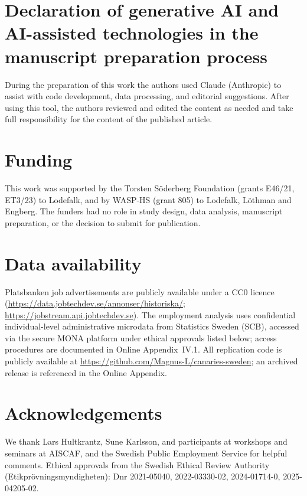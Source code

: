 \documentclass[preprint,12pt,authoryear]{elsarticle}
\begin{document}
\section*{Declaration of generative AI and AI-assisted technologies in the manuscript preparation process}
During the preparation of this work the authors used Claude (Anthropic) to assist with code development, data processing, and editorial suggestions. After using this tool, the authors reviewed and edited the content as needed and take full responsibility for the content of the published article.

\section*{Funding}
This work was supported by the Torsten S\"oderberg Foundation (grants E46/21, ET3/23) to Lodefalk, and by WASP-HS (grant 805) to Lodefalk, L\"othman and Engberg. The funders had no role in study design, data analysis, manuscript preparation, or the decision to submit for publication.

\section*{Data availability}
{\sloppy
Platsbanken job advertisements are publicly available under a CC0 licence (\url{https://data.jobtechdev.se/annonser/historiska/}; \url{https://jobstream.api.jobtechdev.se}). The employment analysis uses confidential individual-level administrative microdata from Statistics Sweden (SCB), accessed via the secure MONA platform under ethical approvals listed below; access procedures are documented in Online Appendix~IV.1. All replication code is publicly available at \url{https://github.com/Magnus-L/canaries-sweden}; an archived release is referenced in the Online Appendix.\par}

\section*{Acknowledgements}
We thank Lars Hultkrantz, Sune Karlsson, and participants at workshops and seminars at AISCAF, and the Swedish Public Employment Service for helpful comments. Ethical approvals from the Swedish Ethical Review Authority (Etikpr\"ovningsmyndigheten): Dnr 2021-05040, 2022-03330-02, 2024-01714-0, 2025-04205-02.



\end{document}
